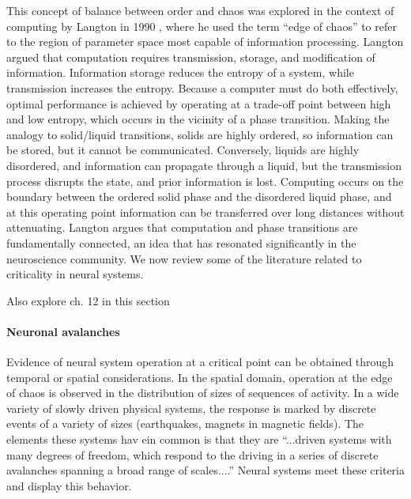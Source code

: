 This concept of balance between order and chaos was explored in the context of computing by Langton in 1990 \cite{la1990}, where he used the term ``edge of chaos'' to refer to the region of parameter space most capable of information processing. Langton argued that computation requires transmission, storage, and modification of information. Information storage reduces the entropy of a system, while transmission increases the entropy. Because a computer must do both effectively, optimal performance is achieved by operating at a trade-off point between high and low entropy, which occurs in the vicinity of a phase transition. Making the analogy to solid/liquid transitions, solids are highly ordered, so information can be stored, but it cannot be communicated. Conversely, liquids are highly disordered, and information can propagate through a liquid, but the transmission process disrupts the state, and prior information is lost. Computing occurs on the boundary between the ordered solid phase and the disordered liquid phase, and at this operating point information can be transferred over long distances without attenuating. Langton argues that computation and phase transitions are fundamentally connected, an idea that has resonated significantly in the neuroscience community. We now review some of the literature related to criticality in neural systems.

\vspace{3em}
Also explore  ch. 12 in this section 

\paragraph{Neuronal avalanches}
Evidence of neural system operation at a critical point can be obtained through temporal or spatial considerations. In the spatial domain, operation at the edge of chaos is observed in the distribution of sizes of sequences of activity. In a wide variety of slowly driven physical systems, the response is marked by discrete events of a variety of sizes \cite{seda2001} (earthquakes, magnets in magnetic fields). The elements these systems hav ein common is that they are ``...driven systems with many degrees of freedom, which respond to the driving in a series of discrete avalanches spanning a broad range of scales....'' \cite{seda2001} Neural systems meet these criteria and display this behavior.

